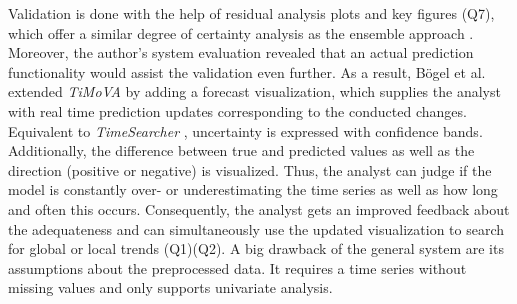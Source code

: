 \documentclass[electronic]{vgtc}             %
\begin{document}
Validation is done with the help of residual analysis plots and key figures (Q7), which offer a similar degree of certainty analysis as the ensemble approach \cite{koepp:2014}.
Moreover, the author's system evaluation revealed that an actual prediction functionality would assist the validation even further.
As a result, B\"ogel et al. \cite{boegl:2014} extended \textit{TiMoVA} by adding a forecast visualization, which supplies the analyst with real time prediction updates corresponding to the conducted changes.
Equivalent to \textit{TimeSearcher} \cite{buono:2007}, uncertainty is expressed with confidence bands. 
Additionally, the difference between true and predicted values as well as the direction (positive or negative) is visualized.
Thus, the analyst can judge if the model is constantly over- or underestimating the time series as well as how long and often this occurs.
Consequently, the analyst gets an improved feedback about the adequateness and can
simultaneously use the updated visualization to search for global or local trends (Q1)(Q2).
A big drawback of the general system are its assumptions about the preprocessed data. 
It requires a time series without missing values and only supports univariate analysis.
\end{document}
